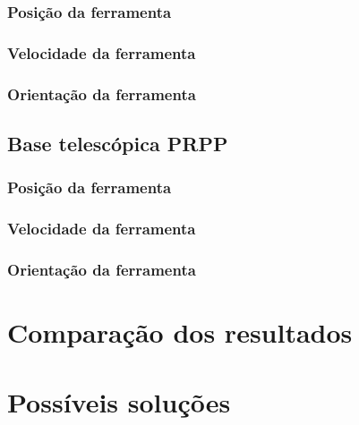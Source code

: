 \lipsum[1-1]

\subsubsection{Posição da ferramenta}

\subsubsection{Velocidade da ferramenta}

\subsubsection{Orientação da ferramenta}

\subsection{Base telescópica PRPP} \label{sec::res_prpp}

\subsubsection{Posição da ferramenta}

\subsubsection{Velocidade da ferramenta}

\subsubsection{Orientação da ferramenta}


\section{Comparação dos resultados} \label{sec::comparacao}


\section{Possíveis soluções} \label{sec::solucoes}

